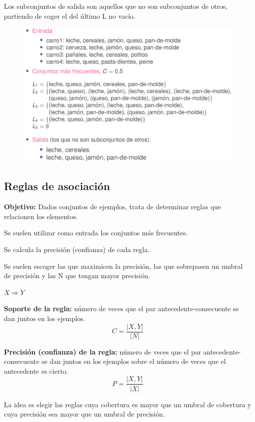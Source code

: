 \documentclass[12pt, twoside, openright]{report} %
\begin{document}
Los subconjuntos de salida son aquellos que no son subconjuntos de otros, partiendo de coger el del último L no vacío.

\begin{figure}[H]
  {\includegraphics[scale=.4]{2021-04-10 01_06_33-ensembles-reglasAsociacion.pdf - Foxit Reader.png}}
\end{figure}

\subsection{Reglas de asociación}
\textbf{Objetivo:} Dados conjuntos de ejemplos, trata de determinar reglas que relacionen los elementos.

Se suelen utilizar como entrada los conjuntos más frecuentes.

Se calcula la precisión (confianza) de cada regla.

Se suelen escoger las que maximicen la precisión, las que sobrepasen un umbral de precisión y las N que tengan mayor precisión.

\begin{center}
  $X \Rightarrow Y$
\end{center}

\textbf{Soporte de la regla:} número de veces que el par antecedente-consecuente se dan juntos en los ejemplos.
$$C = \frac{|X, Y|}{|N|}$$

\textbf{Precisión (confianza) de la regla:} número de veces que el par antecedente-consecuente se dan juntos en los ejemplos sobre el número de veces que el antecedente es cierto.
$$P = \frac{|X, Y|}{|X|}$$

La idea es elegir las reglas cuya cobertura es mayor que un umbral de cobertura y cuya precisión sea mayor que un umbral de precisión.
\end{document}
